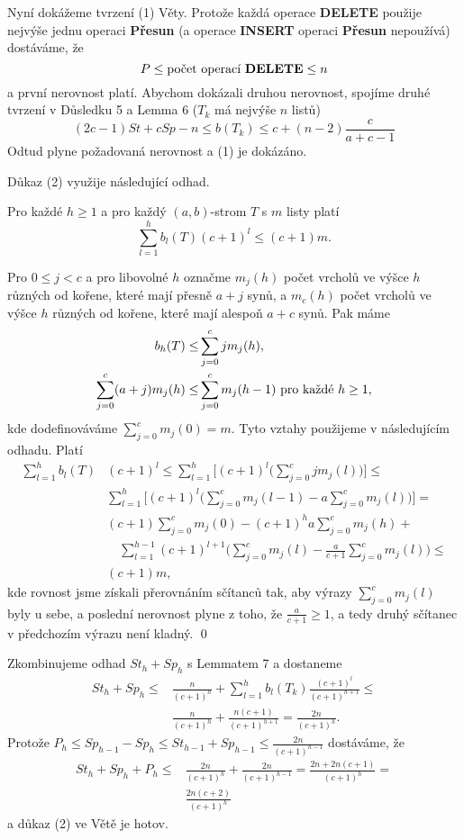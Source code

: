 \documentclass[a4paper,12pt]{article}
\begin{document}
Nyní dokážeme tvrzení (1) Věty. Protože každá operace 
{\bf DE\-LETE} použije nejvýše jednu operaci {\bf Přesun} (a operace 
{\bf INSERT} operaci {\bf Přesun} nepoužívá) dostáváme, že 
$$P\le\text{\rm počet operací {\bf DELETE}}\le n$$
a první nerovnost platí. 
Abychom dokázali druhou nerovnost, spojíme druhé 
tvrzení v Důsledku 5 a Lemma 6 ($T_k$ má nejvýše 
$n$ listů) 
$$(2c-1)St+cSp-n\le b(T_k)\le c+(n-2)\frac c{a+c-1}$$
Odtud plyne požadovaná nerovnost a (1) je dokázáno.

Důkaz (2) využije následující odhad.

\begin{lemma_counting}Pro každé $h\ge 1$ a pro každý 
$(a,b)$-strom $T$ s $m$ listy platí 
$$\sum_{l=1}^hb_l(T)(c+1)^l\le (c+1)m.$$
\end{lemma_counting}

Pro $0\le j<c$ a pro libovolné $h$ 
označme $m_j(h)$ počet vrcholů ve výšce $h$ 
různých od kořene, které mají přesně $a
+j$ 
synů, a $m_c(h)$ počet vrcholů ve výšce $
h$ 
různých od kořene, které mají alespoň $a+c$ 
synů. Pak máme
\begin{align*} b_h(T)\le&\sum_{j=0}^cjm_j(h)\text{\rm},\\
\sum_{j=0}^c(a+j)m_j(h)\le&\sum_{j=0}^cm_j(h-1)\text{\rm\ pro každé }
h\ge 1,\end{align*}
kde dodefinováváme $\sum_{j=0}^cm_j(0)=m$. Tyto vztahy 
použijeme v následujícím odhadu. Platí 
\begin{align*}\sum_{l=1}^hb_l(T)&(c+1)^l\le\sum_{l=1}^h\big[(c+1)^l\big
(\sum_{j=0}^cjm_j(l)\big)\big]\le\\
&\sum_{l=1}^h\big[(c+1)^l\big(\sum_{j=0}^cm_j(l-1)-a\sum_{j=0}^cm_
j(l)\big)\big]=\\
&(c+1)\sum_{j=0}^cm_j(0)-(c+1)^ha\sum_{j=0}^cm_j(h)+\\
&\quad\sum_{l=1}^{h-1}(c+1)^{l+1}\big(\sum_{j=0}^cm_j(l)-\frac a{
c+1}\sum_{j=0}^cm_j(l)\big)\le\\
&(c+1)m,\end{align*}
kde rovnost jsme získali přerovnáním sčítanců 
tak, aby výrazy $\sum_{j=0}^cm_j(l)$ byly u sebe, a poslední 
nerovnost plyne z toho, že $\frac a{c+1}\ge 1$, a tedy druhý sčítanec 
v předchozím výrazu není kladný. \qed
\enddemo
 

Zkombinujeme odhad $St_h+Sp_h$ s Lemmatem 7 a 
dostaneme
\begin{align*} St_h+Sp_h\le&\frac n{(c+1)^h}+\sum_{l=1}^hb_l(T_k)\frac {
(c+1)^l}{(c+1)^{h+1}}\le\\
&\frac n{(c+1)^h}+\frac {n(c+1)}{(c+1)^{h+1}}=\frac {2n}{(c+1)^h}
.\end{align*}
Protože $P_h\le Sp_{h-1}-Sp_h\le St_{h-1}+Sp_{h-1}\le\frac {2n}{
(c+1)^{h-1}}$ 
dostáváme, že 
\begin{align*} St_h+Sp_h+P_h\le&\frac {2n}{(c+1)^h}+\frac {2n}{(c+1)^{h
-1}}=\frac {2n+2n(c+1)}{(c+1)^h}=\\
&\frac {2n(c+2)}{(c+1)^h}\end{align*}
a důkaz (2) ve Větě je hotov.
\end{document}
